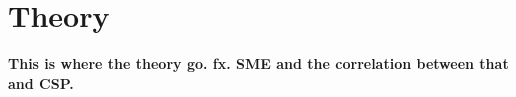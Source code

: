 \documentclass[a4paper]{report}
\begin{document}
%
%
%
%
%
%
%
%
%
%





\chapter{Theory}
\textbf{This is where the theory go. fx. SME and the correlation between that and CSP.}
\end{document}
